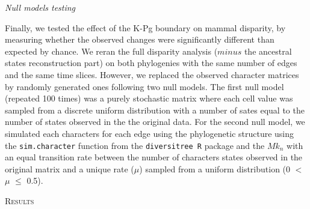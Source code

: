 \documentclass[12pt,letterpaper]{article}
\renewcommand{\section}[1]{%
\bigskip
\begin{center}
\begin{Large}
\normalfont\scshape #1
\medskip
\end{Large}
\end{center}}
\renewcommand{\subsection}[1]{%
\bigskip
\begin{center}
\begin{large}
\normalfont\itshape #1
\end{large}
\end{center}}
\begin{document}
\subsection{Null models testing}
Finally, we tested the effect of the K-Pg boundary on mammal disparity, by measuring whether the observed changes were significantly different than expected by chance.
We reran the full disparity analysis ($minus$ the ancestral states reconstruction part) on both phylogenies with the same number of edges and the same time slices.
However, we replaced the observed character matrices by randomly generated ones following two null models.
The first null model (repeated 100 times) was a purely stochastic matrix where each cell value was sampled from a discrete uniform distribution with a number of sates equal to the number of states observed in the the original data.
For the second null model, we simulated each characters for each edge using the phylogenetic structure using the \texttt{sim.character} function from the \texttt{diversitree R} package \citep{fitzjohndiversitree2012} and the $Mk_n$ \citep{lewisa2001} with an equal transition rate between the number of characters states observed in the original matrix and a unique rate ($\mu$) sampled from a uniform distribution (0 $<$ $\mu$ $\leq$ 0.5). 
%
%

\section{Results}
\end{document}
